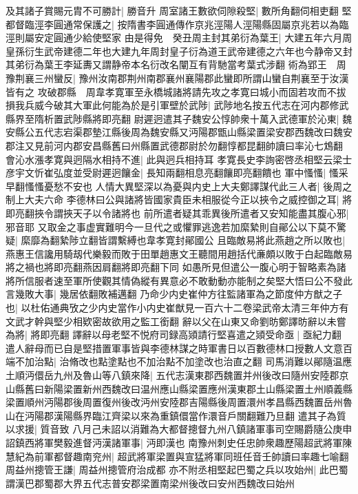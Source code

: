 及其諸子賞賜元胄不可勝計|{
	勝音升}
周室諸王數欲伺隙殺堅|{
	數所角翻伺相吏翻}
堅都督臨涇李圓通常保護之|{
	按隋書李圓通傳作京兆涇陽人涇陽縣固屬京兆若以為臨涇則屬安定圓通少給使堅家}
由是得免　癸丑周主封其弟衍為葉王|{
	大建五年六月周皇孫衍生武帝建德二年也大建九年周封皇子衍為道王武帝建德之六年也今静帝又封其弟衍為葉王李延夀又謂静帝本名衍改名闡互有背馳當考葉式涉翻}
術為郢王　周豫荆襄三州蠻反|{
	豫州汝南郡荆州南郡襄州襄陽郡此蠻即所謂山蠻自荆襄至于汝漢皆有之}
攻破郡縣　周韋孝寛軍至永橋城諸將請先攻之孝寛曰城小而固若攻而不拔損我兵威今破其大軍此何能為於是引軍壁於武陟|{
	武陟地名按五代志在河内郡修武縣界至隋析置武陟縣將即亮翻}
尉遲迥遣其子魏安公惇帥衆十萬入武德軍於沁東|{
	魏安縣公五代志宕渠郡墊江縣後周為魏安縣又沔陽郡甑山縣梁置梁安郡西魏改曰魏安郡注又見前河内郡安昌縣舊曰州縣置武德郡尉於勿翻惇都昆翻帥讀曰率沁七鴆翻}
會沁水漲孝寛與迥隔水相持不進|{
	此與迥兵相持耳}
孝寛長史李詢密啓丞相堅云梁士彦宇文忻崔弘度並受尉遲迥饟金|{
	長知兩翻相息亮翻饟即亮翻饋也}
軍中慅慅|{
	慅采早翻慅慅憂愁不安也}
人情大異堅深以為憂與内史上大夫鄭譯謀代此三人者|{
	後周之制上大夫六命}
李德林曰公與諸將皆國家貴臣未相服從今正以挾令之威控御之耳|{
	將即亮翻挾令謂挾天子以令諸將也}
前所遣者疑其乖異後所遣者又安知能盡其腹心邪|{
	邪音耶}
又取金之事虚實難明今一旦代之或懼罪逃逸若加縻縶則自鄖公以下莫不驚疑|{
	縻靡為翻縶陟立翻皆謂繫縛也韋孝寛封鄖國公}
且臨敵易將此燕趙之所以敗也|{
	燕惠王信讒用騎刼代樂毅而敗于田單趙惠文王聽間用趙括代亷頗以敗于白起臨敵易將之禍也將即亮翻燕因肩翻將即亮翻下同}
如愚所見但遣公一腹心明于智略素為諸將所信服者速至軍所使觀其情偽縱有異意必不敢動動亦能制之矣堅大悟曰公不發此言幾敗大事|{
	幾居依翻敗補邁翻}
乃命少内史崔仲方往監諸軍為之節度仲方猷之子也|{
	以杜佑通典攷之少内史當作小内史崔猷見一百六十二卷梁武帝太清三年仲方有文武才幹與堅少相欵密故欲用之監工銜翻}
辭以父在山東又命劉昉鄭譯昉辭以未嘗為將|{
	將即亮翻}
譯辭以母老堅不悦府司録高熲請行堅喜遣之熲受命亟|{
	亟紀力翻}
遣人辭母而已自是堅措置軍事皆與李德林謀之時軍書日以百數德林口授數人文意百端不加治點|{
	治脩改也點塗點也不加治點不加塗改也治直之翻}
司馬消難以鄖隨温應土順沔儇岳九州及魯山等八鎮來降|{
	五代志漢東郡西魏置并州後改曰隨州安陸郡京山縣舊曰新陽梁置新州西魏改曰温州應山縣梁置應州漢東郡土山縣梁置土州順義縣梁置順州沔陽郡後周置復州後改沔州安陸郡吉陽縣後周置澴州孝昌縣西魏置岳州魯山在沔陽郡漢陽縣界臨江齊梁以來為重鎮儇當作澴音戶關翻難乃旦翻}
遣其子為質以求援|{
	質音致}
八月己未詔以消難為大都督摠督九州八鎮諸軍事司空賜爵隨公庚申詔鎮西將軍樊毅進督沔漢諸軍事|{
	沔即漢也}
南豫州刺史任忠帥衆趣歷陽超武將軍陳慧紀為前軍都督趣南兖州|{
	超武將軍梁置與宣猛將軍同班任音壬帥讀曰率趣七喻翻}
周益州摠管王謙|{
	周益州摠管府治成都}
亦不附丞相堅起巴蜀之兵以攻始州|{
	此巴蜀謂漢巴郡蜀郡大界五代志普安郡梁置南梁州後改曰安州西魏改曰始州}
